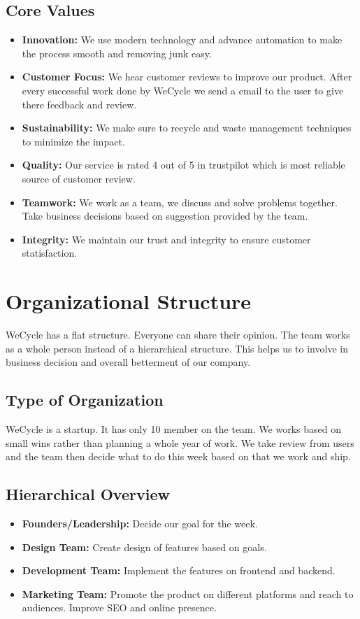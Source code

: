 \subsection{Core Values}
\begin{itemize}
    \item \textbf{Innovation:} We use modern technology and advance automation to make the process smooth and removing junk easy.
    \item \textbf{Customer Focus:} We hear customer reviews to improve our product. After every successful work done by WeCycle we send a email to the user to give there feedback and review.
    \item \textbf{Sustainability:} We make sure to recycle and waste management techniques to minimize the impact.
    \item \textbf{Quality:} Our service is rated 4 out of 5 in trustpilot which is most reliable source of customer review.
    \item \textbf{Teamwork:} We work as a team, we discuss and solve problems together. Take business decisions based on suggestion provided by the team.
    \item \textbf{Integrity:} We maintain our trust and integrity to ensure customer statisfaction.
\end{itemize}

\section{Organizational Structure}

\par WeCycle has a flat structure. Everyone can share their opinion. The team works as a whole person instead of a hierarchical structure. This helps us to involve in business decision and overall betterment of our company.
\subsection{Type of Organization}
\par WeCycle is a startup. It has only 10 member on the team. We works based on small wins rather than planning a whole year of work. We take review from users and the team then decide what to do this week based on that we work and ship.

\subsection{Hierarchical Overview}
\begin{itemize}
    \item \textbf{Founders/Leadership:} Decide our goal for the week.
     \item \textbf{Design Team:} Create design of features based on goals.
    \item \textbf{Development Team:} Implement the features on frontend and backend.
    \item \textbf{Marketing Team:} Promote the product on different platforms and reach to audiences. Improve SEO and online presence.
\end{itemize}

